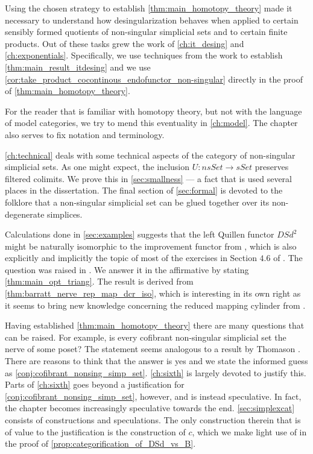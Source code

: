 Using the chosen strategy to establish \cref{thm:main_homotopy_theory} made it necessary to understand how desingularization behaves when applied to certain sensibly formed quotients of non-singular simplicial sets and to certain finite products. Out of these tasks grew the work of \cref{ch:it_desing} and \cref{ch:exponentials}. Specifically, we use techniques from the work to establish \cref{thm:main_result_itdesing} and we use \cref{cor:take_product_cocontinous_endofunctor_non-singular} directly in the proof of \cref{thm:main_homotopy_theory}.

For the reader that is familiar with homotopy theory, but not with the language of model categories, we try to mend this eventuality in \cref{ch:model}. The chapter also serves to fix notation and terminology.

\cref{ch:technical} deals with some technical aspects of the category of non-singular simplicial sets. As one might expect, the inclusion $U:nsSet\to sSet$ preserves filtered colimits. We prove this in \cref{sec:smallness} --- a fact that is used several places in the dissertation. The final section of \cref{sec:formal} is devoted to the folklore that a non-singular simplicial set can be glued together over its non-degenerate simplices.

Calculations done in \cref{sec:examples} suggests that the left Quillen functor $DSd^2$ might be naturally isomorphic to the improvement functor from \cite[Thm.~2.5.2]{WJR13}, which is also explicitly and implicitly the topic of most of the exercises in Section $4.6$ of \cite[pp.~219--220]{FP90}. The question was raised in \cite[Rem.~2.2.12]{WJR13}. We answer it in the affirmative by stating \cref{thm:main_opt_triang}. The result is derived from \cref{thm:barratt_nerve_rep_map_dcr_iso}, which is interesting in its own right as it seems to bring new knowledge concerning the reduced mapping cylinder from \cite[§2.4]{WJR13}.

Having established \cref{thm:main_homotopy_theory} there are many questions that can be raised. For example, is every cofibrant non-singular simplicial set the nerve of some poset? The statement seems analogous to a result by Thomason \cite[Prop.~5.7]{Th80}. There are reasons to think that the answer is yes and we state the informed guess as \cref{conj:cofibrant_nonsing_simp_set}. \cref{ch:sixth} is largely devoted to justify this. Parts of \cref{ch:sixth} goes beyond a justification for \cref{conj:cofibrant_nonsing_simp_set}, however, and is instead speculative. In fact, the chapter becomes increasingly speculative towards the end. \cref{sec:simplexcat} consists of constructions and speculations. The only construction therein that is of value to the justification is the construction of $c$, which we make light use of in the proof of \cref{prop:categorification_of_DSd_vs_B}.






